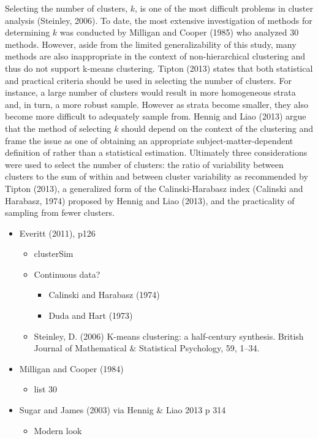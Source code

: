 \documentclass[,man]{apa6}
\providecommand{\tightlist}{%
  \setlength{\itemsep}{0pt}\setlength{\parskip}{0pt}}
\theoremstyle{definition}
\theoremstyle{definition}
\theoremstyle{definition}
\theoremstyle{remark}
\begin{document}
Selecting the number of clusters, \(k\), is one of the most difficult
problems in cluster analysis (Steinley, 2006). To date, the most
extensive investigation of methods for determining \(k\) was conducted
by Milligan and Cooper (1985) who analyzed 30 methods. However, aside
from the limited generalizability of this study, many methods are also
inappropriate in the context of non-hierarchical clustering and thus do
not support k-means clustering. Tipton (2013) states that both
statistical and practical criteria should be used in selecting the
number of clusters. For instance, a large number of clusters would
result in more homogeneous strata and, in turn, a more robust sample.
However as strata become smaller, they also become more difficult to
adequately sample from. Hennig and Liao (2013) argue that the method of
selecting \(k\) should depend on the context of the clustering and frame
the issue as one of obtaining an appropriate subject-matter-dependent
definition of rather than a statistical estimation. Ultimately three
considerations were used to select the number of clusters: the ratio of
variability between clusters to the sum of within and between cluster
variability as recommended by Tipton (2013), a generalized form of the
Calinski-Harabasz index (Calinski and Harabasz, 1974) proposed by Hennig
and Liao (2013), and the practicality of sampling from fewer clusters.

\begin{itemize}
\tightlist
\item
  Everitt (2011), p126

  \begin{itemize}
  \tightlist
  \item
    clusterSim
  \item
    Continuous data?

    \begin{itemize}
    \tightlist
    \item
      Calinski and Harabasz (1974)
    \item
      Duda and Hart (1973)
    \end{itemize}
  \item
    Steinley, D. (2006) K-means clustering: a half-century synthesis.
    British Journal of Mathematical \& Statistical Psychology, 59,
    1--34.
  \end{itemize}
\item
  Milligan and Cooper (1984)

  \begin{itemize}
  \tightlist
  \item
    list 30
  \end{itemize}
\item
  Sugar and James (2003) via Hennig \& Liao 2013 p 314

  \begin{itemize}
  \tightlist
  \item
    Modern look
  \end{itemize}
\end{itemize}
\end{document}
